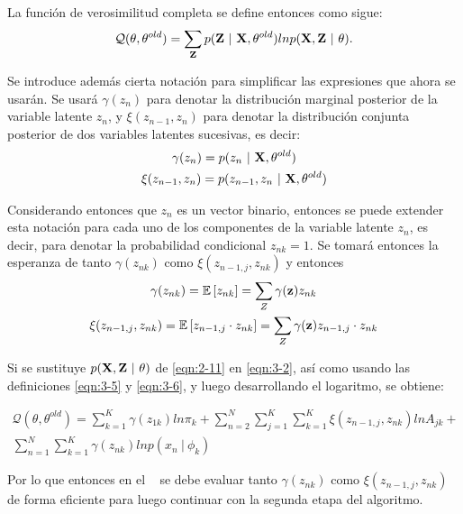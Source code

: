 La función de verosimilitud completa se define entonces como sigue:
\begin{equation}
\mathcal{Q}(\theta, \theta^{old}) = 
  \sum_{\textbf{Z}} p(\textbf{Z} ~|~ \textbf{X}, \theta^{old})
  ln p(\textbf{X}, \textbf{Z} ~|~ \theta).
\label{eqn:3-2}
\end{equation}

Se introduce además cierta notación para simplificar las expresiones que ahora se usarán. Se usará $\gamma(z_n)$ para denotar la distribución marginal posterior de la variable latente $z_n$, y $\xi(z_{n-1}, z_n)$ para denotar la distribución conjunta posterior de dos variables latentes sucesivas, es decir: 
\begin{gather}
\gamma(z_n) = p(z_n ~|~ \textbf{X}, \theta^{old}) \label{eqn:3-3} \\
\xi(z_{n-1}, z_n) = p(z_{n-1}, z_n ~|~ \textbf{X}, \theta^{old}) \label{eqn:3-4}
\end{gather}

Considerando entonces que $z_n$ es un vector binario, entonces se puede extender esta notación para cada uno de los componentes de la variable latente $z_n$, es decir, para denotar la probabilidad condicional $z_{nk} = 1$. Se
tomará entonces la esperanza de tanto $\gamma(z_{nk})$ como $\xi(z_{n-1, j}, z_{nk})$ y entonces
\begin{gather}
\gamma(z_{nk}) = \mathbb{E} \left[ z_{nk} \right] = \sum_Z  \gamma(\textbf{z}) z_{nk} \label{eqn:3-5} \\
\xi(z_{n-1,j}, z_{nk}) = \mathbb{E} \left[z_{n-1, j} \cdot z_{nk} \right] = \sum_Z  \gamma(\textbf{z}) z_{n-1, j} 
\cdot z_{nk}
\label{eqn:3-6}
\end{gather}

Si se sustituye $p(\textbf{X}, \textbf{Z} ~|~ \theta)$ de \eqref{eqn:2-11} en \eqref{eqn:3-2}, así como usando las definiciones \eqref{eqn:3-5} y \eqref{eqn:3-6}, y luego desarrollando el logaritmo, se obtiene: 

\begin{equation}
\begin{split}
\mathcal{Q}(\theta, \theta^{old}) = 
  \sum_{k=1}^K \gamma(z_{1k}) ln \pi_k + 
  \sum_{n=2}^N \sum_{j=1}^K \sum_{k=1}^K \xi(z_{n-1,j}, z_{nk}) ln A_{jk} + \\
  \sum_{n=1}^N \sum_{k=1}^K \gamma(z_{nk}) ln p(x_n ~|~ \phi_k)
\label{eqn:3-7}
\end{split}
\end{equation}

Por lo que entonces en el \estep~ se debe evaluar tanto $\gamma(z_{nk})$ como $\xi(z_{n-1,j}, z_{nk})$ de forma eficiente para luego continuar con la segunda etapa del algoritmo.


